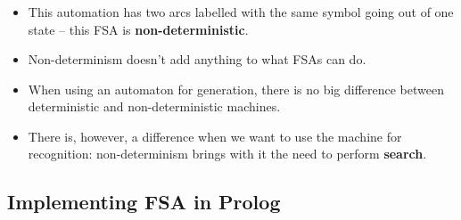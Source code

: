 \begin{frame}

	\frametitle{\insertsection}
	\framesubtitle{\insertsubsection}
	
	\begin{itemize}
		\item This automation has two arcs labelled with the same symbol going out of one state -- this FSA is \textbf{non-deterministic}.
		\item Non-determinism doesn't add anything to what FSAs can do.
		\item When using an automaton for generation, there is no big difference between deterministic and non-deterministic machines.
		\item There is, however, a difference when we want to use the machine for recognition: non-determinism brings with it the need to perform \textbf{search}.
	\end{itemize}

\end{frame}


\subsection{Implementing FSA in Prolog}


\begin{frame}

	\frametitle{\insertsection}
	\framesubtitle{\insertsubsection}
	

\end{frame}


